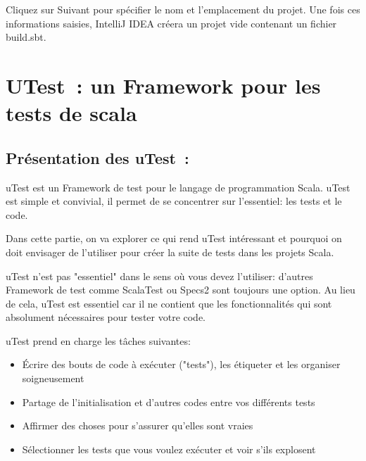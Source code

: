 \documentclass[12pt]{article}
\begin{document}

\par

Cliquez sur Suivant pour spécifier le nom et l'emplacement du projet. Une fois ces informations saisies, IntelliJ IDEA créera un projet vide contenant un fichier build.sbt.\par

\section{UTest : un Framework pour les tests de scala}

\subsection{Présentation des uTest :}

\begin{justify}
uTest est un Framework de test pour le langage de programmation Scala. uTest est simple et convivial, il permet de se concentrer sur l'essentiel: les tests et le code. 
\end{justify}\par

\begin{justify}
Dans cette partie, on va explorer ce qui rend uTest intéressant et pourquoi on doit envisager de l'utiliser pour créer la suite de tests dans les projets Scala.
\end{justify}\par

\begin{justify}
uTest n'est pas "essentiel" dans le sens où vous devez l'utiliser: d'autres Framework de test comme ScalaTest ou Specs2 sont toujours une option. Au lieu de cela, uTest est essentiel car il ne contient que les fonctionnalités qui sont absolument nécessaires pour tester votre code.
\end{justify}\par

uTest prend en charge les tâches suivantes:\par

\begin{itemize}
	\item Écrire des bouts de code à exécuter ("tests"), les étiqueter et les organiser soigneusement\par

	\item Partage de l'initialisation et d'autres codes entre vos différents tests\par

	\item Affirmer des choses pour s'assurer qu'elles sont vraies\par

	\item Sélectionner les tests que vous voulez exécuter et voir s'ils explosent
\end{itemize}\par
\end{document}
